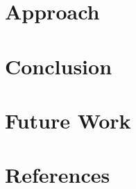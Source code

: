 \documentclass[a4paper,parskip=half]{scrartcl}
\newcommand{\msgpack}{{\small MessagePack}\xspace}
\begin{document}

\newpage

\newpage

\newpage

\newpage
\tableofcontents
\newpage


\section{Approach}
\label{sec:approach}



 
 

\section{Conclusion}
\label{sec:conclusion}
\section{Future Work}
\label{sec:future}
\newpage
\section*{References}
\renewcommand\refname{}


\newpage
\listoftodos[Notes] %
\end{document}
